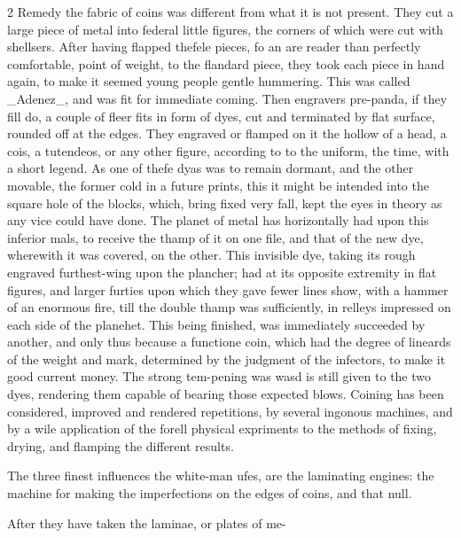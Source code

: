 \documentclass[10pt]{article}
\begin{document}
\begin{multicols}{2}
Remedy the fabric of coins was different from what it is not present. They cut a large piece of metal into federal little figures, the corners of which were cut with shellsers. After having flapped thefele pieces, fo an are reader than perfectly comfortable, point of weight, to the flandard piece, they took each piece in hand again, to make it seemed young people gentle hummering. This was called \_Adenez\_, and was fit for immediate coming. Then engravers pre-panda, if they fill do, a couple of fleer fits in form of dyes, cut and terminated by flat surface, rounded off at the edges. They engraved or flamped on it the hollow of a head, a cois, a tutendeos, or any other figure, according to to the uniform, the time, with a short legend. As one of thefe dyas was to remain dormant, and the other movable, the former cold in a future prints, this it might be intended into the square hole of the blocks, which, bring fixed very fall, kept the eyes in theory as any vice could have done. The planet of metal has horizontally had upon this inferior mals, to receive the thamp of it on one file, and that of the new dye, wherewith it was covered, on the other. This invisible dye, taking its rough engraved furthest-wing upon the plancher; had at its opposite extremity in flat figures, and larger furties upon which they gave fewer lines show, with a hammer of an enormous fire, till the double thamp was sufficiently, in relleys impressed on each side of the planehet. This being finished, was immediately succeeded by another, and only thus because a functione coin, which had the degree of lineards of the weight and mark, determined by the judgment of the infectors, to make it good current money. The strong tem-pening was wasd is still given to the two dyes, rendering them capable of bearing those expected blows. Coining has been considered, improved and rendered repetitions, by several ingonous machines, and by a wile application of the forell physical expriments to the methods of fixing, drying, and flamping the different results.

The three finest influences the white-man ufes, are the laminating engines: the machine for making the imperfections on the edges of coins, and that null.

After they have taken the laminae, or plates of me-


\end{multicols}
\end{document}
